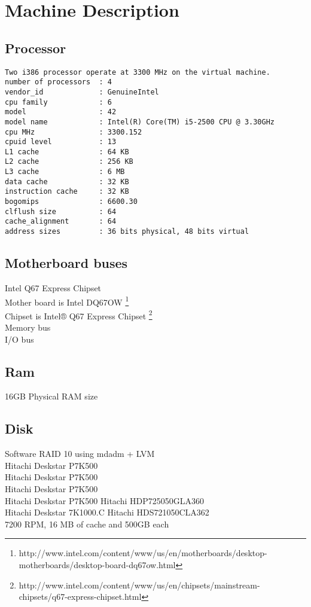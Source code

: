 \section{Machine Description}

\subsection{Processor}

\begin{verbatim}
Two i386 processor operate at 3300 MHz on the virtual machine. 
number of processors  : 4
vendor_id             : GenuineIntel
cpu family            : 6
model                 : 42
model name            : Intel(R) Core(TM) i5-2500 CPU @ 3.30GHz
cpu MHz               : 3300.152
cpuid level           : 13
L1 cache              : 64 KB
L2 cache              : 256 KB
L3 cache              : 6 MB
data cache            : 32 KB
instruction cache     : 32 KB
bogomips              : 6600.30
clflush size          : 64
cache_alignment       : 64
address sizes         : 36 bits physical, 48 bits virtual
\end{verbatim}

\subsection{Motherboard buses}
	Intel Q67 Express Chipset\\
	Mother board is Intel DQ67OW
\footnote{http://www.intel.com/content/www/us/en/motherboards/desktop-motherboards/desktop-board-dq67ow.html}\\
	Chipset is Intel® Q67 Express Chipset \footnote{http://www.intel.com/content/www/us/en/chipsets/mainstream-chipsets/q67-express-chipset.html}\\
    	Memory bus\\
	I/O bus\\

\subsection{Ram}
	16GB Physical RAM size\\

\subsection{Disk}
	Software RAID 10 using mdadm + LVM\\
Hitachi Deskstar P7K500 \\
Hitachi Deskstar P7K500\\
Hitachi Deskstar P7K500\\
Hitachi Deskstar P7K500 Hitachi HDP725050GLA360 \\
Hitachi Deskstar 7K1000.C Hitachi HDS721050CLA362\\
7200 RPM, 16 MB of cache and 500GB each

